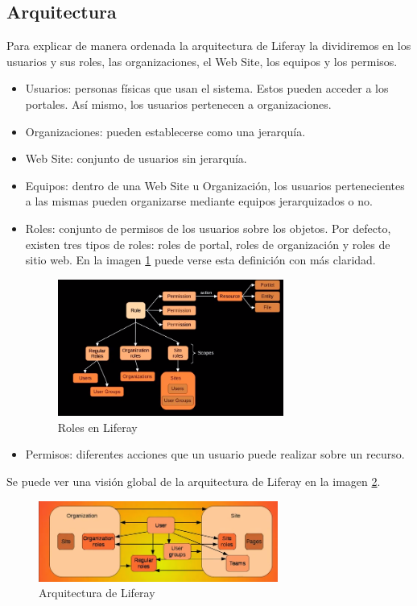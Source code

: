 \subsection{Arquitectura}
\par Para explicar de manera ordenada la arquitectura de Liferay la dividiremos en los usuarios y sus roles, las organizaciones, el Web Site, los equipos y los permisos.
\begin{itemize}
    \item Usuarios: personas físicas que usan el sistema. Estos pueden acceder a los portales. Así mismo, los usuarios pertenecen a organizaciones.
    \item Organizaciones: pueden establecerse como una jerarquía.
    \item Web Site: conjunto de usuarios sin jerarquía.
    \item Equipos: dentro de una Web Site u Organización, los usuarios pertenecientes a las mismas pueden organizarse mediante equipos jerarquizados o no.
    \item Roles: conjunto de permisos de los usuarios sobre los objetos. Por defecto, existen tres tipos de roles: roles de portal, roles de organización y roles de sitio web. En la imagen \ref{img:roles} puede verse esta definición con más claridad.
    \begin{figure}[H]
    \begin{center}
    \includegraphics[width=0.7\textwidth]{./img/liferay_roles.png}
    \end{center}
    \caption{Roles en Liferay}
    \label{img:roles}
    \end{figure}

    \item Permisos: diferentes acciones que un usuario puede realizar sobre un recurso.
\end{itemize}
\par Se puede ver una visión global de la arquitectura de Liferay en la imagen \ref{img:arch}.
\begin{figure}[H]
\begin{center}
\includegraphics[width=0.7\textwidth]{./img/liferay_arch.png}
\end{center}
\caption{Arquitectura de Liferay}
\label{img:arch}
\end{figure}

